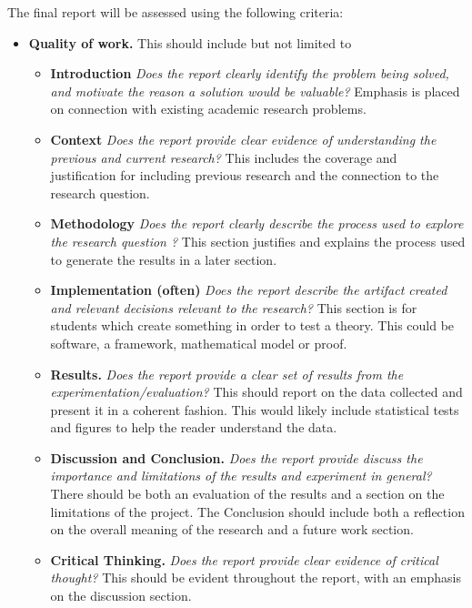 The final report will be assessed using the following
criteria:
\begin{itemize}
\item {\bf Quality of work.} This should include but not limited to

\begin{itemize}
  \item {\bf Introduction}  {\em Does the report
    clearly identify the problem being solved, and motivate the reason
    a solution would be valuable?}  Emphasis is placed on connection 
    with existing academic research problems.

  \item {\bf Context}  {\em Does the report provide clear evidence of 
  understanding the previous and current research?}  This includes the 
  coverage and justification for including previous research and the connection to the research question.

  \item {\bf Methodology}  {\em Does the report clearly describe the 
  process used to explore the research question ?}  This section justifies 
  and explains the process used to generate the results in a later section.
  
   \item {\bf Implementation (often)}  {\em Does the report describe the artifact created 
   and relevant decisions relevant to the research?}  This section is for students 
   which create something in order to test a theory. 
   This could be software, a framework, mathematical model or proof. 

  \item {\bf Results.}  {\em Does the report provide a clear set of results from the experimentation/evaluation?}   
  This should report on the data collected and present it in a coherent fashion. 
  This would likely include statistical tests and figures to help the reader understand the data. 

  \item {\bf Discussion and Conclusion.}  
  {\em Does the report provide discuss the importance and limitations of the results and experiment in general?}  
  There should be both an evaluation of the results and a section on the limitations of the project. 
  The Conclusion should include both a reflection on the overall meaning of the research and a future work section. 

  \item {\bf Critical Thinking.}  {\em Does the report provide clear
    evidence of critical thought?}  This should be evident throughout
  the report, with an emphasis on the discussion section.
  \end{itemize}


\end{itemize}
